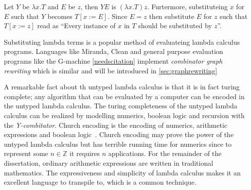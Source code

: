 \documentclass[11pt,oneside,a4paper]{report}
\begin{document}
\begin{exmp}
\label{ex:application}
Let $Y$ be $\lambda x . T$ and $E$ be $z$, then $Y E$ is $(\lambda x . T) z$.
Furtermore, substituteing $x$ for $E$ such that $Y$ becomes $T[x := E]$.
Since $E = z$ then substitute $E$ for $z$ such that $T[x := z]$ read as ``Every instance of $x$ in $T$ should be substituted by $z$''.
\end{exmp}
\begin{remark}
Substituting lambda terms is a popular method of evaluateing lambda calculus programs.
Languages like Miranda, Clean and general purpose evaluation programs like the G-machine \autoref{needscitation} implement \textit{combinator graph rewriting} which is similar and will be introduced in \autoref{sec:graphrewriting}
\end{remark}

A remarkable fact about th untyped lambda calculus is that it is in fact turing complete; any algorithm that can be evaluated by a computer can be encoded in the untyped lambda calculus.
The turing completeness of the untyped lambda calculus can be realized by modelling numerics, boolean logic and recursion with the \textit{Y-combitator}.
Church encoding is the encoding of numerics, arithmetic expressions and boolean logic~\cite{church1985calculi}.
Church encoding may prove the power of the untyped lambda calculus but has terrible running time for numerics since to represent some $n \in \mathbb{Z}$ it requires $n$ applications.
For the remainder of the dissertation, ordinary arithmetic expressions are written in traditional mathematics.
The expressiveness and simplicity of lambda calculus makes it an excellent language to transpile to, which is a common technique.
\end{document}
